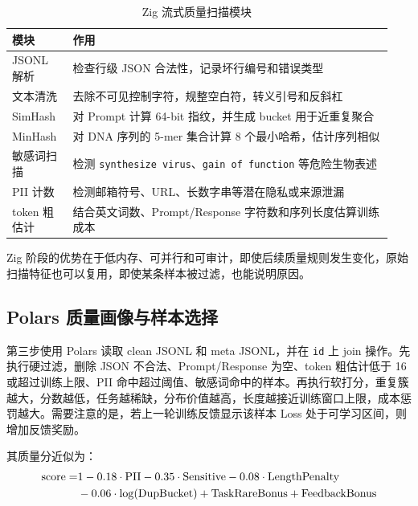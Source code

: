 \documentclass{article}
\begin{document}
\begin{table}[H]
    \centering
    \renewcommand{\arraystretch}{1.2}
    \setlength{\tabcolsep}{6pt}
    \caption{Zig 流式质量扫描模块}
    \begin{tabular}{
        >{\centering\arraybackslash}p{0.15\linewidth}
        >{\centering\arraybackslash}p{0.79\linewidth}
    }
        \bottomrule[1.5pt]
        模块 & 作用 \\
        \midrule[0.75pt]
        JSONL 解析 & 检查行级 JSON 合法性，记录坏行编号和错误类型 \\
        文本清洗 & 去除不可见控制字符，规整空白符，转义引号和反斜杠 \\
        SimHash & 对 Prompt 计算 64-bit 指纹，并生成 bucket 用于近重复聚合 \\
        MinHash & 对 DNA 序列的 5-mer 集合计算 8 个最小哈希，估计序列相似 \\
        敏感词扫描 & 检测 \texttt{synthesize virus}、\texttt{gain of function} 等危险生物表述 \\
        PII 计数 & 检测邮箱符号、URL、长数字串等潜在隐私或来源泄漏 \\
        token 粗估计 & 结合英文词数、Prompt/Response 字符数和序列长度估算训练成本 \\
        \toprule[1.5pt]
    \end{tabular}
\end{table}

Zig 阶段的优势在于低内存、可并行和可审计，即使后续质量规则发生变化，原始扫描特征也可以复用，即使某条样本被过滤，也能说明原因。



\subsection{Polars 质量画像与样本选择}
第三步使用 Polars 读取 clean JSONL 和 meta JSONL，并在 \texttt{id} 上 join 操作。先执行硬过滤，删除 JSON 不合法、Prompt/Response 为空、token 粗估计低于 16 或超过训练上限、PII 命中超过阈值、敏感词命中的样本。再执行软打分，重复簇越大，分数越低，任务越稀缺，分布价值越高，长度越接近训练窗口上限，成本惩罚越大。需要注意的是，若上一轮训练反馈显示该样本 Loss 处于可学习区间，则增加反馈奖励。

其质量分近似为：
\begin{align}
    \mathrm{score}=&1-0.18\cdot\mathrm{PII}-0.35\cdot\mathrm{Sensitive}-0.08\cdot\mathrm{LengthPenalty} \notag
    \\
    &-0.06\cdot\log(\mathrm{DupBucket})+\mathrm{TaskRareBonus}+\mathrm{FeedbackBonus}
\end{align}
\end{document}

